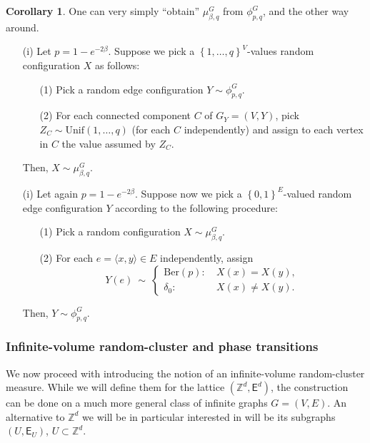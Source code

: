 \documentclass[12pt]{article}
\newcommand{\E}{\mathsf{E}}
\newcommand{\Z}{\mathbb{Z}}
\newcommand{\set}[1]{\left\{#1\right\}}
\newcommand{\1}{\mathbbm{1}}
\renewcommand{\sp}[1]{\langle #1\rangle}
\newcommand{\5}{\vspace{0.5cm}}
\theoremstyle{definition}
\newtheorem{cor}[thm]{Corollary}
\begin{document}
\begin{cor}\label{cor:EdwardsSokal}
One can very simply ``obtain'' $\mu_{\beta,q}^G$ from $\phi_{p,q}^G$, and the other way around.
\begin{itemize}
	\item[(i)] Let $p=1-e^{-2\beta}$. Suppose we pick a $\set{1,\ldots,q}^V$-values random configuration $X$ as follows:
	\begin{itemize}
		\item[(1)] Pick a random edge configuration $Y\sim\phi_{p,q}^G$.
		\item[(2)]  For each connected component $C$ of $G_Y=(V,Y)$, pick $Z_C\sim\mathrm{Unif}(1,\ldots,q)$ (for each $C$ independently) and assign to each vertex in $C$ the value assumed by $Z_C$.
	\end{itemize}
	Then, $X\sim\mu_{\beta,q}^G$.
	\item[(i)] Let again $p=1-e^{-2\beta}$. Suppose now we pick a $\set{0,1}^E$-valued random edge configuration $Y$ according to the following procedure:
	\begin{itemize}
		\item[(1)] Pick a random configuration $X\sim\mu_{\beta,q}^G$.
		\item[(2)] For each $e=\sp{x,y}\in E$ independently, assign
		$$Y(e) ~\sim~ \begin{cases}
		\mathrm{Ber}(p): ~&X(x)=X(y),\\
		\delta_0: ~&X(x)\neq X(y).
		\end{cases}$$
	\end{itemize}
	Then, $Y\sim\phi_{p,q}^G$.
\end{itemize}
\end{cor}


\subsubsection{Infinite-volume random-cluster and phase transitions}\label{subsec:RCinf}

We now proceed with introducing the notion of an infinite-volume random-cluster measure. While we will define them for the lattice $(\Z^d,\E^d)$, the construction can be done on a much more general class of infinite graphs $G=(V,E)$. An alternative to $\Z^d$ we will be in particular interested in will be its subgraphs $(U,\E_U)$, $U\subset\Z^d$. \\
\end{document}
